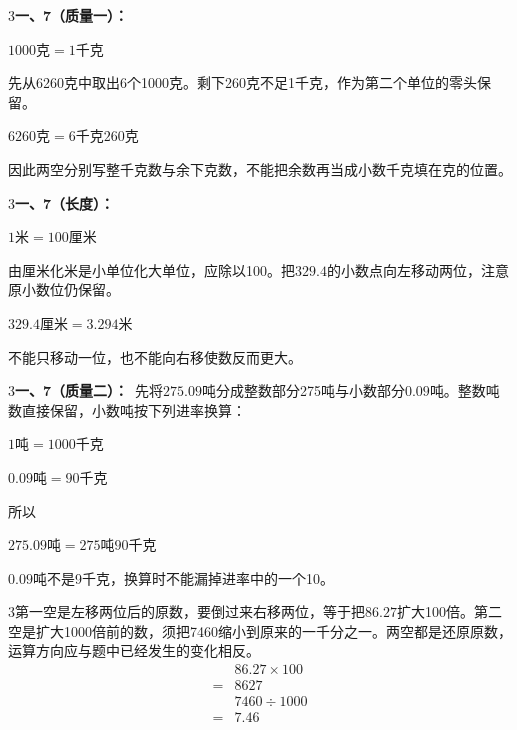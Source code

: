 \documentclass[multi=snippet,border={5bp 20bp 5bp 5bp}]{standalone}
\newenvironment{snippet}[3]{\begin{minipage}{#1bp}\color{answerred}\fontsize{#2}{#3}\selectfont\raggedright}{\end{minipage}}
\begin{document}
\begin{snippet}{505}{11.5}{14}\begin{multicols}{3}\raggedcolumns \textbf{一、7（质量一）：}\ \par\noindent\(\displaystyle 1000\text{克}=1\text{千克}\)\allowbreak \par 先从6260克中取出6个1000克。剩下260克不足1千克，作为第二个单位的零头保留。\par\noindent\(\displaystyle 6260\text{克}=6\text{千克}260\text{克}\)\allowbreak \par 因此两空分别写整千克数与余下克数，不能把余数再当成小数千克填在克的位置。\end{multicols}\end{snippet}
\begin{snippet}{505}{11.5}{14}\begin{multicols}{3}\raggedcolumns \textbf{一、7（长度）：}\ \par\noindent\(\displaystyle 1\text{米}=100\text{厘米}\)\allowbreak \par 由厘米化米是小单位化大单位，应除以100。把\(329.4\)\allowbreak 的小数点向左移动两位，注意原小数位仍保留。\par\noindent\(\displaystyle 329.4\text{厘米}=3.294\text{米}\)\allowbreak \par 不能只移动一位，也不能向右移使数反而更大。\end{multicols}\end{snippet}
\begin{snippet}{505}{11.5}{14}\begin{multicols}{3}\raggedcolumns \textbf{一、7（质量二）：}\ 先将\(275.09\)\allowbreak 吨分成整数部分275吨与小数部分\(0.09\)\allowbreak 吨。整数吨数直接保留，小数吨按下列进率换算：\par\noindent\(\displaystyle 1\text{吨}=1000\text{千克}\)\allowbreak \par \noindent\(\displaystyle 0.09\text{吨}=90\text{千克}\)\allowbreak \par 所以\par\noindent\(\displaystyle 275.09\text{吨}=275\text{吨}90\text{千克}\)\allowbreak \par\(0.09\)\allowbreak 吨不是9千克，换算时不能漏掉进率中的一个10。\end{multicols}\end{snippet}
\begin{snippet}{505}{11.5}{14}\begin{multicols}{3}\raggedcolumns 第一空是左移两位后的原数，要倒过来右移两位，等于把\(86.27\)\allowbreak 扩大100倍。第二空是扩大1000倍前的数，须把7460缩小到原来的一千分之一。两空都是还原原数，运算方向应与题中已经发生的变化相反。\[\begin{aligned}&86.27\times100\\={}&8627\\&7460\div1000\\={}&7.46\end{aligned}\]\end{multicols}\end{snippet}
\end{document}
